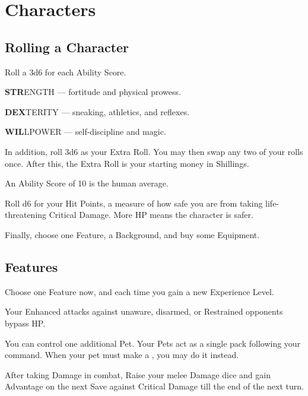 \documentclass[itdr/core]{subfiles}
\begin{document}
\chapter{Characters}
\label{ch:characters}

\section{Rolling a Character}

Roll a 3d6 for each Ability Score.

\textbf{STR}ENGTH --- fortitude and physical prowess.

\textbf{DEX}TERITY --- sneaking, athletics, and reflexes.

\textbf{WIL}LPOWER --- self-discipline and magic.

In addition, roll 3d6 as your Extra Roll. You may then swap any two of your rolls once. After this, the Extra Roll is your starting money in Shillings.

An Ability Score of 10 is the human average.

Roll d6 for your Hit Points, a measure of how safe you are from taking life-threatening Critical \mbox{Damage}. More HP means the character is safer.

Finally, choose one Feature, a Background, and buy some Equipment.

\section{Features}

Choose one Feature now, and each time you gain a new Experience Level.

\vfill
{}
Your Enhanced attacks against unaware, disarmed, or Restrained opponents bypass HP.

\vfill
{}\featmt
You can control one additional Pet. Your Pets act as a single pack following your command. When your pet must make a , you may do it instead.

\vfill
{}\feathp
After taking Damage in combat, Raise your melee Damage dice and gain Advantage on the next Save against Critical Damage till the end of the next turn.
\end{document}

